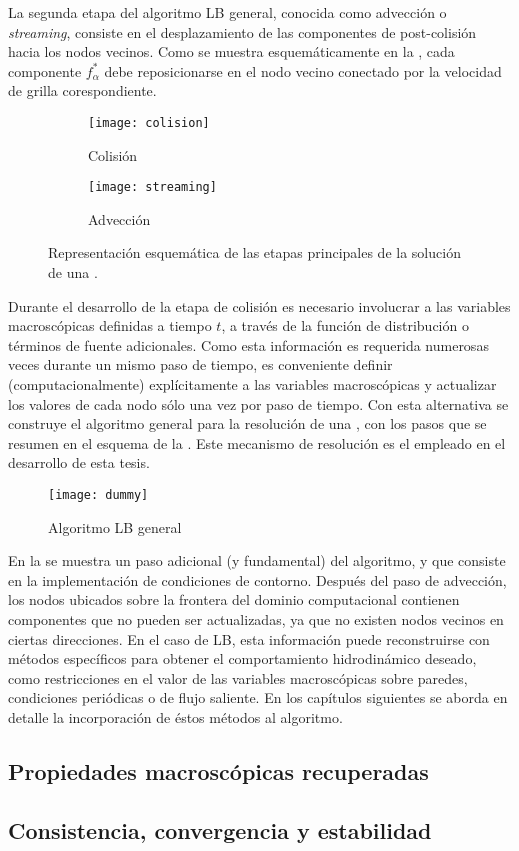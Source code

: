 La segunda etapa del algoritmo LB general, conocida como advecci\'on o \emph{streaming}, consiste en el desplazamiento de las componentes de post-colisi\'on hacia los nodos vecinos. Como se muestra esquem\'aticamente en la , cada componente $f_{\alpha}^*$ debe reposicionarse en el nodo vecino conectado por la velocidad de grilla corespondiente.

\begin{figure}[htb]
    \centering
    \begin{subfigure}[t]{0.45\textwidth}
        \centering
        \texttt{[image: colision]}
        \caption{Colisi\'on}        
    \end{subfigure}
    \begin{subfigure}[t]{0.45\textwidth}
        \centering
        \texttt{[image: streaming]}
        \caption{Advecci\'on}        
    \end{subfigure}
    \caption{Representaci\'on esquem\'atica de las etapas principales de la soluci\'on de una \lbe{}.}
    \label{fig:lb_str_col}
\end{figure}

Durante el desarrollo de la etapa de colisi\'on es necesario involucrar a las variables macrosc\'opicas definidas a tiempo $t$, a trav\'es de la funci\'on de distribuci\'on o t\'erminos de fuente adicionales. Como esta informaci\'on es requerida numerosas veces durante un mismo paso de tiempo, es conveniente definir (computacionalmente) expl\'icitamente a las variables macrosc\'opicas y actualizar los valores de cada nodo s\'olo una vez por paso de tiempo. Con esta alternativa se construye el algoritmo general para la resoluci\'on de una \lbe{}, con los pasos que se resumen en el esquema de la . Este mecanismo de resoluci\'on es el empleado en el desarrollo de esta tesis.
\begin{figure}[ht]
	\centering
	\texttt{[image: dummy]}
	\caption{Algoritmo LB general}
	\label{fig:lb_algo}
\end{figure}

En la  se muestra un paso adicional (y fundamental) del algoritmo, y que consiste en la implementaci\'on de condiciones de contorno. Despu\'es del paso de advecci\'on, los nodos ubicados sobre la frontera del dominio computacional contienen componentes que no pueden ser actualizadas, ya que no existen nodos vecinos en ciertas direcciones. En el caso de LB, esta informaci\'on puede reconstruirse con m\'etodos espec\'ificos para obtener el comportamiento hidrodin\'amico deseado, como restricciones en el valor de las variables macrosc\'opicas sobre paredes, condiciones peri\'odicas o de flujo saliente. En los cap\'itulos siguientes se aborda en detalle la incorporaci\'on de \'estos m\'etodos al algoritmo.


\subsection{Propiedades macrosc\'opicas recuperadas}



\subsection{Consistencia, convergencia y estabilidad}
